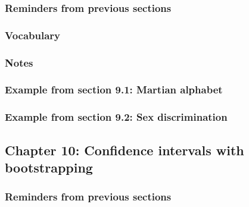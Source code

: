 \documentclass[
]{report}
\begin{document}
\hypertarget{reminders-from-previous-sections}{%
\subsubsection*{Reminders from previous sections}\label{reminders-from-previous-sections}}

\hypertarget{vocabulary-9}{%
\subsubsection*{Vocabulary}\label{vocabulary-9}}

\hypertarget{notes-13}{%
\subsubsection*{Notes}\label{notes-13}}

\hypertarget{example-from-section-9.1-martian-alphabet}{%
\subsubsection*{Example from section 9.1: Martian alphabet}\label{example-from-section-9.1-martian-alphabet}}

\hypertarget{example-from-section-9.2-sex-discrimination}{%
\subsubsection*{Example from section 9.2: Sex discrimination}\label{example-from-section-9.2-sex-discrimination}}

\hypertarget{chapter-10-confidence-intervals-with-bootstrapping}{%
\subsection*{Chapter 10: Confidence intervals with bootstrapping}\label{chapter-10-confidence-intervals-with-bootstrapping}}

\hypertarget{reminders-from-previous-sections-1}{%
\subsubsection*{Reminders from previous sections}\label{reminders-from-previous-sections-1}}
\end{document}
